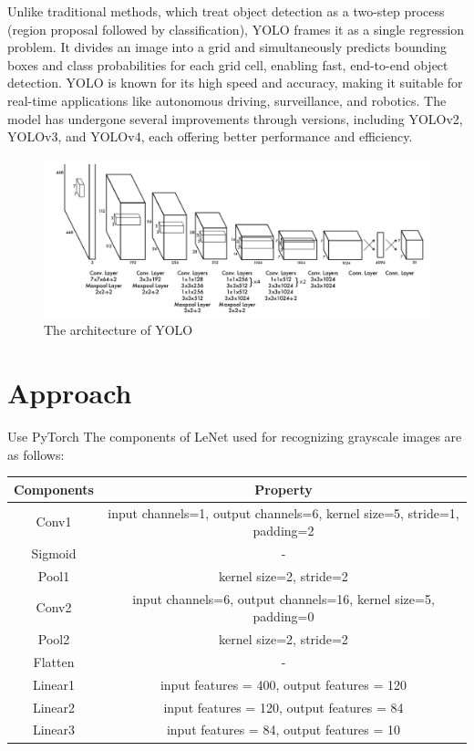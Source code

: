 \documentclass{article}
\begin{document}
Unlike traditional methods, which treat object detection as a two-step process (region proposal followed by classification), YOLO frames it as a single regression problem.
It divides an image into a grid and simultaneously predicts bounding boxes and class probabilities for each grid cell, enabling fast, end-to-end object detection.
YOLO is known for its high speed and accuracy, making it suitable for real-time applications like autonomous driving, surveillance, and robotics.
The model has undergone several improvements through versions, including YOLOv2, YOLOv3, and YOLOv4, each offering better performance and efficiency.
\begin{figure}[H]
  \centering
  \includegraphics[width=0.8\linewidth]{./yolo.png}
  \caption{The architecture of YOLO}
\end{figure}

\section{Approach}
Use PyTorch
The components of LeNet used for recognizing grayscale images are as follows:
\begin{table}[h]
  \centering
  \begin{tabular}{c|c}
    Components & Property \\ \hline
    Conv1 & {input channels=1, output channels=6, kernel size=5, stride=1, padding=2} \\ 
    Sigmoid & - \\
    Pool1 & {kernel size=2, stride=2} \\
    Conv2 & {input channels=6, output channels=16, kernel size=5, padding=0} \\
    Pool2 & {kernel size=2, stride=2} \\
    Flatten & - \\
    {Linear1} & {input features = 400, output features = 120} \\
    {Linear2} & {input features = 120, output features = 84} \\
    {Linear3} & {input features = 84, output features = 10} 
  \end{tabular}  
\end{table}
\end{document}
